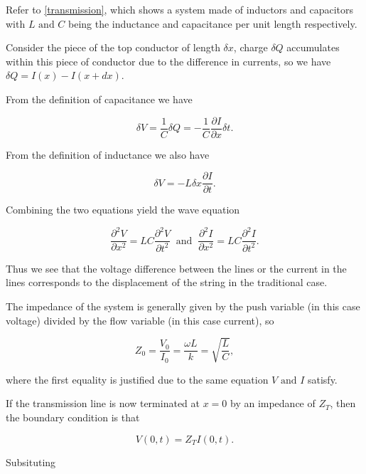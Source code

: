 \documentclass[a4paper,12pt]{report}
\begin{document}
{Refer to \cref{transmission}, which shows a system made of inductors and capacitors with \(L \text { and } C\) being the inductance and capacitance per unit length respectively. }
{Consider the piece of the top conductor of length \(\delta x\), charge \(\delta Q\) accumulates within this piece of conductor due to the difference in currents, so we have \(\delta Q = I(x) - I(x+dx)\).

From the definition of capacitance we have

\begin{equation}
	\delta V = \frac{1}{C} \delta Q = -\frac{1}{C} \frac{\partial I}{\partial x} \delta t. 
\end{equation}

From the definition of inductance we also have

\begin{equation}
	\delta V = -L \delta x \frac{\partial I}{\partial t}.
\end{equation}

Combining the two equations yield the wave equation 

\begin{equation}
	\frac{\partial^2 V}{\partial x^2} = LC \frac{\partial^2 V}{\partial t^2} ~\text { and }~ \frac{\partial^2 I}{\partial x^2} = LC \frac{\partial^2 I}{\partial t^2}. 
\end{equation}

Thus we see that the voltage difference between the lines or the current in the lines corresponds to the displacement of the string in the traditional case.

The impedance of the system is generally given by the push variable (in this case voltage) divided by the flow variable (in this case current), so 

\begin{equation}
	Z_0  = \frac{V_0}{I_0 } = \frac{\omega L}{k} = \sqrt{\frac{L}{C} },   
\end{equation}

where the first equality is justified due to the same equation \(V \text { and }  I\) satisfy. 

If the transmission line is now terminated at \(x=0\) by an impedance of \(Z_{T} \), then the boundary condition is that 

\begin{equation}
	V(0,t) = Z_{T} I(0,t).
\end{equation}

Subsituting 

}
\end{document}
